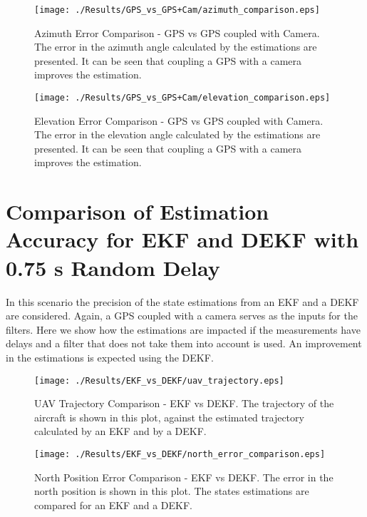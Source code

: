 \begin{figure}[H]
  \centering
  \texttt{[image: ./Results/GPS\_vs\_GPS+Cam/azimuth\_comparison.eps]}
  \caption[Azimuth Error Comparison - GPS vs GPS coupled with Camera]{Azimuth Error Comparison - GPS vs GPS coupled with Camera. The error in the azimuth angle calculated by the estimations are presented. It can be seen that coupling a GPS with a camera improves the estimation.}
\end{figure}
\begin{figure}[H]
  \centering
  \texttt{[image: ./Results/GPS\_vs\_GPS+Cam/elevation\_comparison.eps]}
  \caption[Elevation Error Comparison - GPS vs GPS coupled with Camera]{Elevation Error Comparison - GPS vs GPS coupled with Camera. The error in the elevation angle calculated by the estimations are presented. It can be seen that coupling a GPS with a camera improves the estimation.}
\end{figure}

\pagebreak

\section{Comparison of Estimation Accuracy for EKF and DEKF with 0.75 s Random Delay}
In this scenario the precision of the state estimations from an EKF and a DEKF are considered. Again, a GPS coupled with a camera serves as the inputs for the filters. Here we show how the estimations are impacted if the measurements have delays and a filter that does not take them into account is used. An improvement in the estimations is expected using the DEKF.

\begin{figure}[H]
  \centering
  \texttt{[image: ./Results/EKF\_vs\_DEKF/uav\_trajectory.eps]}
  \caption[UAV Trajectory Comparison - EKF vs DEKF]{UAV Trajectory Comparison - EKF vs DEKF. The trajectory of the aircraft is shown in this plot, against the estimated trajectory calculated by an EKF and by a DEKF.}
\end{figure}

\begin{figure}[H]
  \centering
  \texttt{[image: ./Results/EKF\_vs\_DEKF/north\_error\_comparison.eps]}
  \caption[North Position Error Comparison - EKF vs DEKF]{North Position Error Comparison - EKF vs DEKF. The error in the north position is shown in this plot. The states estimations are compared for an EKF and a DEKF.}
\end{figure}

